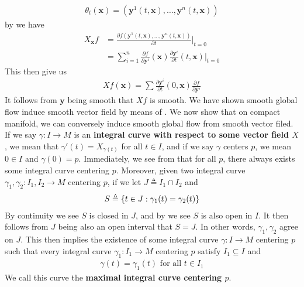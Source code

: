 \documentclass{report}
\begin{document}
\begin{mdframed}
\begin{align*}
\theta_t(\textbf{x})=(\textbf{y}^1(t,\textbf{x}),\dots ,\textbf{y}^n(t,\textbf{x}))
\end{align*}
by  we have
\begin{align*}
X_{\textbf{x}}f&= \frac{\partial f(\textbf{y}^1(t,\textbf{x}),\dots ,\textbf{y}^n(t,\textbf{x}))}{\partial t}\Big|_{t=0}\\
&= \sum_{i=1}^n \frac{\partial f}{\partial \textbf{y}^i}(\textbf{x}) \frac{\partial \textbf{y}^i}{\partial t}(t,\textbf{x})\Big|_{t=0}
\end{align*}
This then give us 
\begin{align*}
Xf(\textbf{x})= \sum  \frac{\partial \textbf{y}^i}{\partial t}(0,\textbf{x}) \frac{\partial f}{\partial \textbf{y}^i} 
\end{align*}
It follows from $\textbf{y}$ being smooth that $Xf$ is smooth. We have shown smooth global flow induce smooth vector field by means of . We now show that on compact manifold, we can conversely induce smooth global flow from smooth vector filed.\\

If we say  $\gamma :I\rightarrow M$ is an \textbf{integral curve with respect to some vector field $X$}, we mean that $\gamma '(t)=X_{\gamma (t)}$ for all $t \in I$, and if we say $\gamma $ centers $p$, we mean  $0 \in I$ and $\gamma (0)=p$. Immediately, we see from  that for all $p$, there always exists some integral curve centering  $p$. Moreover, given two integral curve $\gamma_1,\gamma_2:I_1,I_2\rightarrow M$ centering $p$, if we let  $J\triangleq I_1\cap I_2$ and 
\begin{align*}
S\triangleq \{ t \in J:\gamma _1(t)=\gamma_2(t) \}
\end{align*}
By continuity we see $S$ is closed in  $J$, and by  we see $S$ is also open in $I$. It then follows from  $J$ being also an open interval that  $S=J$. In other words,  $\gamma_1,\gamma _2$ agree on $J$. This then implies the existence of some integral curve $\gamma:I\rightarrow M$ centering $p$ such that every integral curve $\gamma_1:I_1\rightarrow M$ centering $p$ satisfy  $I_1 \subseteq I$ and 
\begin{align*}
\gamma (t)=\gamma_1(t)\text{ for all }t\in I_1
\end{align*}
We call this curve the \textbf{maximal integral curve centering $p$}. 
\end{mdframed}
\end{document}
